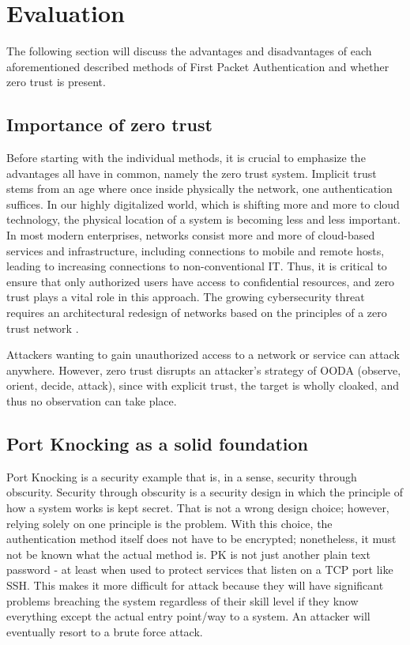 
\section{Evaluation}
\label{sec:eval}

The following section will discuss the advantages and disadvantages of each aforementioned described methods of First Packet Authentication and whether zero trust is present.\par


\subsection{Importance of zero trust}

Before starting with the individual methods, it is crucial to emphasize the advantages all have in common, namely the zero trust system.  Implicit trust stems from an age where once inside physically the network, one authentication suffices.  In our highly digitalized world, which is shifting more and more to cloud technology, the physical location of a system is becoming less and less important.  In most modern enterprises, networks consist more and more of cloud-based services and infrastructure, including connections to mobile and remote hosts, leading to increasing connections to non-conventional IT.  
Thus, it is critical to ensure that only authorized users have access to confidential resources, and zero trust plays a vital role in this approach. The growing cybersecurity threat requires an architectural redesign of networks based on the principles of a zero trust network \cite{7796146}.   \par
Attackers wanting to gain unauthorized access to a network or service can attack anywhere.  However, zero trust disrupts an attacker's strategy of OODA (observe, orient, decide, attack), since with explicit trust, the target is wholly cloaked, and thus no observation can take place.\par


\subsection{Port Knocking as a solid foundation}

Port Knocking is a security example that is, in a sense, security through obscurity.  Security through obscurity is a security design in which the principle of how a system works is kept secret.   That is not a wrong design choice; however, relying solely on one principle is the problem.  With this choice, the authentication method itself does not have to be encrypted; nonetheless, it must not be known what the actual method is.  PK is not just another plain text password - at least when used to protect services that listen on a TCP port like SSH.  This makes it more difficult for attack because they will have significant problems breaching the system regardless of their skill level if they know everything except the actual entry point/way to a system.  An attacker will eventually resort to a brute force attack.

